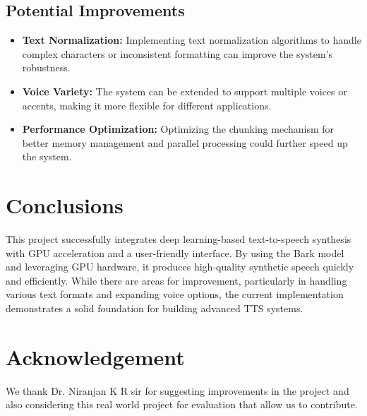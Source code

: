 \documentclass[12pt, a4paper]{article}
\begin{document}
\subsection{Potential Improvements}

\begin{itemize}

\item \textbf{Text Normalization:} Implementing text normalization algorithms to handle complex characters or inconsistent formatting can improve the system's robustness.

\item \textbf{Voice Variety:} The system can be extended to support multiple voices or accents, making it more flexible for different applications.

\item \textbf{Performance Optimization:} Optimizing the chunking mechanism for better memory management and parallel processing could further speed up the system.

\end{itemize}


\section{Conclusions}

This project successfully integrates deep learning-based text-to-speech synthesis with GPU acceleration and a user-friendly interface. By using the Bark model and leveraging GPU hardware, it produces high-quality synthetic speech quickly and efficiently. While there are areas for improvement, particularly in handling various text formats and expanding voice options, the current implementation demonstrates a solid foundation for building advanced TTS systems.



\section{Acknowledgement}

We thank Dr. Niranjan K R sir for suggesting improvements in the project and also considering this real world project for evaluation that allow us to contribute.
 
\end{document}
